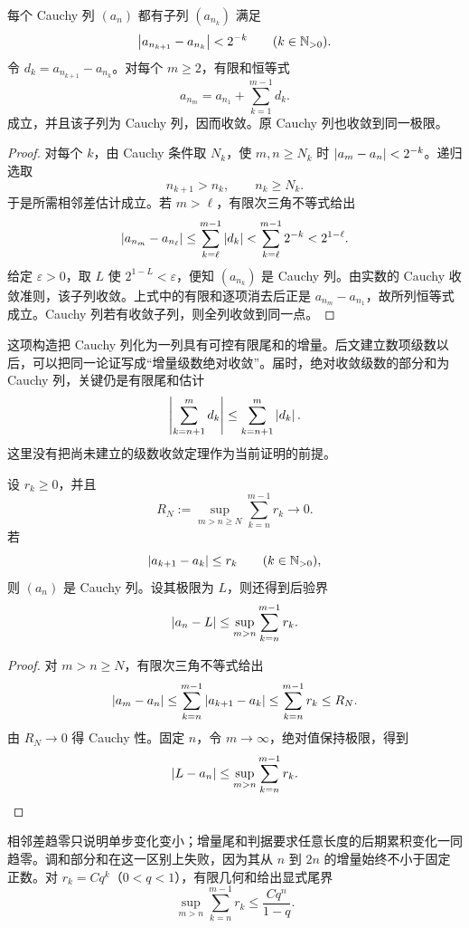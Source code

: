 \begin{proposition}[快速 Cauchy 子列]
每个 Cauchy 列 \((a_n)\) 都有子列 \((a_{n_k})\) 满足
\[
 \left|a_{n_{k+1}}-a_{n_k}\right|<2^{-k}\qquad(k\in\mathbb{N}_{>0}).
\]
令 \(d_k=a_{n_{k+1}}-a_{n_k}\)。对每个 \(m\ge2\)，有限和恒等式
\[
 a_{n_m}=a_{n_1}+\sum_{k=1}^{m-1}d_k.
\]
成立，并且该子列为 Cauchy 列，因而收敛。原 Cauchy 列也收敛到同一极限。
\end{proposition}

\begin{proof}
对每个 \(k\)，由 Cauchy 条件取 \(N_k\)，使 \(m,n\ge N_k\) 时 \(\left|a_m-a_n\right|<2^{-k}\)。递归选取
\[
 n_{k+1}>n_k,\qquad n_k\ge N_k.
\]
于是所需相邻差估计成立。若 \(m>\ell\)，有限次三角不等式给出
\[
 \left|a_{n_m}-a_{n_\ell}\right|
 \le \sum_{k=\ell}^{m-1}\left|d_k\right|
 <\sum_{k=\ell}^{m-1}2^{-k}
 <2^{1-\ell}.
\]
给定 \(\varepsilon>0\)，取 \(L\) 使 \(2^{1-L}<\varepsilon\)，便知 \((a_{n_k})\) 是 Cauchy 列。由实数的 Cauchy 收敛准则，该子列收敛。上式中的有限和逐项消去后正是 \(a_{n_m}-a_{n_1}\)，故所列恒等式成立。Cauchy 列若有收敛子列，则全列收敛到同一点。
\end{proof}

这项构造把 Cauchy 列化为一列具有可控有限尾和的增量。后文建立数项级数以后，可以把同一论证写成“增量级数绝对收敛”。届时，绝对收敛级数的部分和为 Cauchy 列，关键仍是有限尾和估计
\[
 \left|\sum_{k=n+1}^{m}d_k\right|
 \le\sum_{k=n+1}^{m}\left|d_k\right|.
\]
这里没有把尚未建立的级数收敛定理作为当前证明的前提。

\begin{proposition}[增量尾和判据]
设 \(r_k\ge0\)，并且
\[
 R_N:=\sup_{m>n\ge N}\sum_{k=n}^{m-1}r_k\longrightarrow0.
\]
若
\[
 \left|a_{k+1}-a_k\right|\le r_k\qquad(k\in\mathbb{N}_{>0}),
\]
则 \((a_n)\) 是 Cauchy 列。设其极限为 \(L\)，则还得到后验界
\[
 \left|a_n-L\right|\le
 \sup_{m>n}\sum_{k=n}^{m-1}r_k.
\]
\end{proposition}

\begin{proof}
对 \(m>n\ge N\)，有限次三角不等式给出
\[
 \left|a_m-a_n\right|
 \le\sum_{k=n}^{m-1}\left|a_{k+1}-a_k\right|
 \le\sum_{k=n}^{m-1}r_k
 \le R_N.
\]
由 \(R_N\to0\) 得 Cauchy 性。固定 \(n\)，令 \(m\to\infty\)，绝对值保持极限，得到
\[
 \left|L-a_n\right|
 \le\sup_{m>n}\sum_{k=n}^{m-1}r_k.
\]
\end{proof}

相邻差趋零只说明单步变化变小；增量尾和判据要求任意长度的后期累积变化一同趋零。调和部分和在这一区别上失败，因为其从 \(n\) 到 \(2n\) 的增量始终不小于固定正数。对 \(r_k=Cq^k\)（\(0<q<1\)），有限几何和给出显式尾界
\[
 \sup_{m>n}\sum_{k=n}^{m-1}r_k
 \le\frac{Cq^n}{1-q}.
\]

